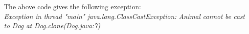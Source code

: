 The above code gives the following exception: \\
\textit{Exception in thread "main" java.lang.ClassCastException: Animal cannot be cast to Dog
	at Dog.clone(Dog.java:7)}